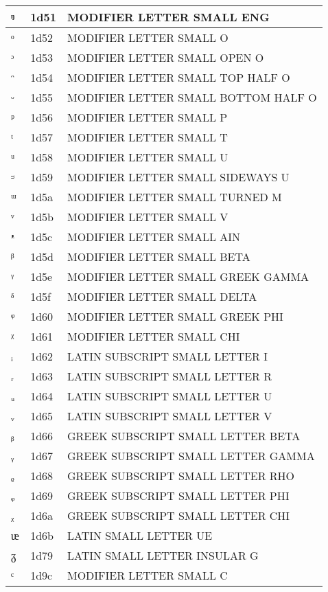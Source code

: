 \documentclass[12pt,letterpaper,openany]{book}
\begin{document}
\begin{center}
\begin{supertabular}{|m{0.25in}|m{0.5in}|m{4in}|}
			ᵑ & 1d51 & MODIFIER LETTER SMALL ENG\\\hline
			ᵒ & 1d52 & MODIFIER LETTER SMALL O\\\hline
			ᵓ & 1d53 & MODIFIER LETTER SMALL OPEN O\\\hline
			ᵔ & 1d54 & MODIFIER LETTER SMALL TOP HALF O\\\hline
			ᵕ & 1d55 & MODIFIER LETTER SMALL BOTTOM HALF O\\\hline
			ᵖ & 1d56 & MODIFIER LETTER SMALL P\\\hline
			ᵗ & 1d57 & MODIFIER LETTER SMALL T\\\hline
			ᵘ & 1d58 & MODIFIER LETTER SMALL U\\\hline
			ᵙ & 1d59 & MODIFIER LETTER SMALL SIDEWAYS U\\\hline
			ᵚ & 1d5a & MODIFIER LETTER SMALL TURNED M\\\hline
			ᵛ & 1d5b & MODIFIER LETTER SMALL V\\\hline
			ᵜ & 1d5c & MODIFIER LETTER SMALL AIN\\\hline
			ᵝ & 1d5d & MODIFIER LETTER SMALL BETA\\\hline
			ᵞ & 1d5e & MODIFIER LETTER SMALL GREEK GAMMA\\\hline
			ᵟ & 1d5f & MODIFIER LETTER SMALL DELTA\\\hline
			ᵠ & 1d60 & MODIFIER LETTER SMALL GREEK PHI\\\hline
			ᵡ & 1d61 & MODIFIER LETTER SMALL CHI\\\hline
			ᵢ & 1d62 & LATIN SUBSCRIPT SMALL LETTER I\\\hline
			ᵣ & 1d63 & LATIN SUBSCRIPT SMALL LETTER R\\\hline
			ᵤ & 1d64 & LATIN SUBSCRIPT SMALL LETTER U\\\hline
			ᵥ & 1d65 & LATIN SUBSCRIPT SMALL LETTER V\\\hline
			ᵦ & 1d66 & GREEK SUBSCRIPT SMALL LETTER BETA\\\hline
			ᵧ & 1d67 & GREEK SUBSCRIPT SMALL LETTER GAMMA\\\hline
			ᵨ & 1d68 & GREEK SUBSCRIPT SMALL LETTER RHO\\\hline
			ᵩ & 1d69 & GREEK SUBSCRIPT SMALL LETTER PHI\\\hline
			ᵪ & 1d6a & GREEK SUBSCRIPT SMALL LETTER CHI\\\hline
			ᵫ & 1d6b & LATIN SMALL LETTER UE\\\hline
			ᵹ & 1d79 & LATIN SMALL LETTER INSULAR G\\\hline
			ᶜ & 1d9c & MODIFIER LETTER SMALL C\\\hline

\end{supertabular}
\end{center}
\end{document}
